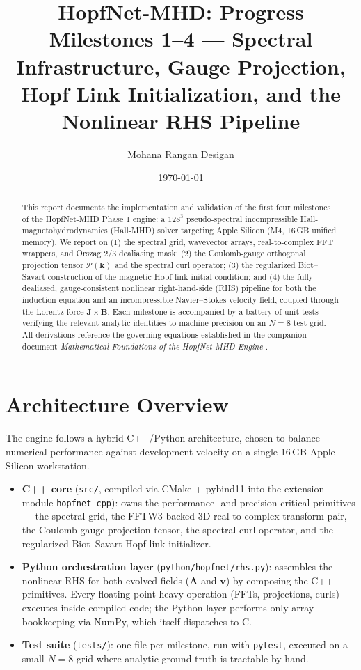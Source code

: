 \documentclass[11pt, a4paper]{article}
\title{\textbf{HopfNet-MHD: Progress} \\
\large Milestones 1--4 --- Spectral Infrastructure, Gauge Projection, \\
Hopf Link Initialization, and the Nonlinear RHS Pipeline}
\author{Mohana Rangan Desigan}
\date{\today}
\begin{document}
\maketitle

\begin{abstract}
This report documents the implementation and validation of the first four
milestones of the HopfNet-MHD Phase 1 engine: a $128^3$ pseudo-spectral
incompressible Hall-magnetohydrodynamics (Hall-MHD) solver targeting Apple
Silicon (M4, 16\,GB unified memory). We report on (1) the spectral grid,
wavevector arrays, real-to-complex FFT wrappers, and Orszag $2/3$
dealiasing mask; (2) the Coulomb-gauge orthogonal projection tensor
$\mathcal{P}(\mathbf{k})$ and the spectral curl operator; (3) the
regularized Biot--Savart construction of the magnetic Hopf link initial
condition; and (4) the fully dealiased, gauge-consistent nonlinear
right-hand-side (RHS) pipeline for both the induction equation and an
incompressible Navier--Stokes velocity field, coupled through the Lorentz
force $\mathbf{J}\times\mathbf{B}$. Each milestone is accompanied by a
battery of unit tests verifying the relevant analytic identities to
machine precision on an $N=8$ test grid. All derivations reference the
governing equations established in the companion document
\emph{Mathematical Foundations of the HopfNet-MHD Engine}
\citep{foundation2026}.
\end{abstract}

\tableofcontents
\newpage

\section{Architecture Overview}
\label{sec:architecture}

The engine follows a hybrid C++/Python architecture, chosen to balance
numerical performance against development velocity on a single
16\,GB Apple Silicon workstation.

\begin{itemize}
    \item \textbf{C++ core} (\texttt{src/}, compiled via CMake +
    pybind11 into the extension module \texttt{hopfnet\_cpp}): owns the
    performance- and precision-critical primitives --- the spectral grid,
    the FFTW3-backed 3D real-to-complex transform pair, the Coulomb gauge
    projection tensor, the spectral curl operator, and the regularized
    Biot--Savart Hopf link initializer.
    \item \textbf{Python orchestration layer}
    (\texttt{python/hopfnet/rhs.py}): assembles the nonlinear RHS for both
    evolved fields ($\mathbf{A}$ and $\mathbf{v}$) by composing the C++
    primitives. Every floating-point-heavy operation (FFTs, projections,
    curls) executes inside compiled code; the Python layer performs only
    array bookkeeping via NumPy, which itself dispatches to C.
    \item \textbf{Test suite} (\texttt{tests/}): one file per milestone,
    run with \texttt{pytest}, executed on a small $N=8$ grid where
    analytic ground truth is tractable by hand.
\end{itemize}
\end{document}
